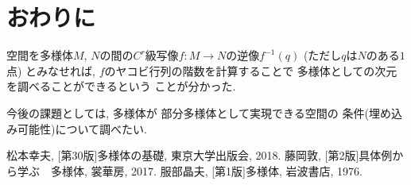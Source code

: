 \documentclass[twocolumn]{jarticle}
\theoremstyle{definition}
\begin{document}
\section{おわりに}
空間を多様体$M$, $N$の間の$C^r$級写像$f:M\to N$の逆像$f^{-1}(q)$
(ただし$q$は$N$のある$1$点)
とみなせれば, $f$のヤコビ行列の階数を計算することで
多様体としての次元を調べることができるという
ことが分かった. 

今後の課題としては, 多様体が
部分多様体として実現できる空間の
条件(埋め込み可能性)について調べたい. 
\begin{thebibliography}{99}
   松本幸夫, [第30版]多様体の基礎, 東京大学出版会, 2018.
   藤岡敦, [第2版]具体例から学ぶ　多様体, 裳華房, 2017.
   服部晶夫, [第1版]多様体, 岩波書店, 1976.
  \end{thebibliography}
\end{document}
